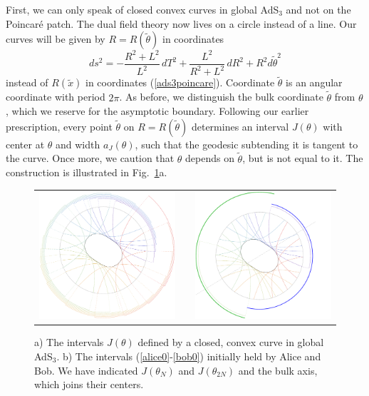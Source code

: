 \documentclass[12pt]{article}
\begin{document}
First, we can only speak of closed convex curves in global AdS$_3$ and not on the Poincar{\'e} patch. The dual field theory now lives on a circle instead of a line. Our curves will be given by $R = R(\tilde\theta)$ in coordinates
\begin{equation}
ds^2 = - \frac{R^2+L^2}{L^2}\, dT^2 + \frac{L^2}{R^2+L^2}\, dR^2 + R^2 d\tilde{\theta}^2
\label{ads3global}
\end{equation}
instead of $R(\tilde{x})$ in coordinates (\ref{ads3poincare}). Coordinate $\tilde\theta$ is an angular coordinate with period $2\pi$. As before, we distinguish the bulk coordinate $\tilde\theta$ from $\theta$, which we reserve for the asymptotic boundary. Following our earlier prescription, every point $\tilde\theta$ on $R = R(\tilde\theta)$ determines an interval $J(\theta)$ with center at $\theta$ and width $a_J(\theta)$, such that the geodesic subtending it is tangent to the curve. Once more, we caution that $\theta$ depends on $\tilde\theta$, but is not equal to it. The construction is illustrated in Fig.~\ref{picswap}a.

\begin{figure}[t!]
\centering
\begin{tabular}{lp{1.5cm}r}
\raisebox{5.5cm}{a)}\includegraphics[width=.40\textwidth]{swapints.pdf}
&&
\raisebox{5.5cm}{b)}\includegraphics[width=.40\textwidth]{swapab.pdf}
\end{tabular}
\caption{a) The intervals $J(\theta)$ defined by a closed, convex curve in global AdS$_3$. b) The intervals (\ref{alice0}-\ref{bob0}) initially held by Alice and Bob. We have indicated $J(\theta_N)$ and $J(\theta_{2N})$ and the bulk axis, which joins their centers.}
\label{picswap}
\end{figure}
\end{document}
